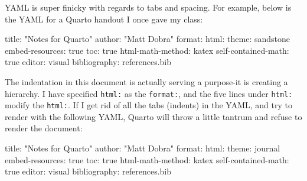 \documentclass[
  letterpaper,
]{book}
\newenvironment{Shaded}{\begin{snugshade}}{\end{snugshade}}
\newcommand{\NormalTok}[1]{\textcolor[rgb]{0.00,0.23,0.31}{#1}}
\newcommand{\SpecialCharTok}[1]{\textcolor[rgb]{0.37,0.37,0.37}{#1}}
\newcommand{\StringTok}[1]{\textcolor[rgb]{0.13,0.47,0.30}{#1}}
\begin{document}
\begin{tcolorbox}[enhanced jigsaw, colframe=quarto-callout-tip-color-frame, breakable, arc=.35mm, bottomtitle=1mm, bottomrule=.15mm, colbacktitle=quarto-callout-tip-color!10!white, rightrule=.15mm, colback=white, opacityback=0, opacitybacktitle=0.6, coltitle=black, left=2mm, toptitle=1mm, toprule=.15mm, titlerule=0mm, leftrule=.75mm, title=\textcolor{quarto-callout-tip-color}{\faLightbulb}\hspace{0.5em}{Tip from the Helpdesk: You Need to Give the YAML Space!}]

YAML is super finicky with regards to tabs and spacing. For example,
below is the YAML for a Quarto handout I once gave my class:

\begin{Shaded}
\begin{Highlighting}[]
\NormalTok{title}\SpecialCharTok{:} \StringTok{"Notes for Quarto"}
\NormalTok{author}\SpecialCharTok{:} \StringTok{"Matt Dobra"}
\NormalTok{format}\SpecialCharTok{:} 
\NormalTok{  html}\SpecialCharTok{:}
\NormalTok{    theme}\SpecialCharTok{:}\NormalTok{ sandstone  }
\NormalTok{    embed}\SpecialCharTok{{-}}\NormalTok{resources}\SpecialCharTok{:}\NormalTok{ true}
\NormalTok{    toc}\SpecialCharTok{:}\NormalTok{ true}
\NormalTok{    html}\SpecialCharTok{{-}}\NormalTok{math}\SpecialCharTok{{-}}\NormalTok{method}\SpecialCharTok{:}\NormalTok{ katex}
\NormalTok{    self}\SpecialCharTok{{-}}\NormalTok{contained}\SpecialCharTok{{-}}\NormalTok{math}\SpecialCharTok{:}\NormalTok{ true}
\NormalTok{editor}\SpecialCharTok{:}\NormalTok{ visual}
\NormalTok{bibliography}\SpecialCharTok{:}\NormalTok{ references.bib}
\end{Highlighting}
\end{Shaded}

The indentation in this document is actually serving a purpose-it is
creating a hierarchy. I have specified \texttt{html:} as the
\texttt{format:}, and the five lines under \texttt{html:} modify the
\texttt{html:}. If I get rid of all the tabs (indents) in the YAML, and
try to render with the following YAML, Quarto will throw a little
tantrum and refuse to render the document:

\begin{Shaded}
\begin{Highlighting}[]
\NormalTok{title}\SpecialCharTok{:} \StringTok{"Notes for Quarto"}
\NormalTok{author}\SpecialCharTok{:} \StringTok{"Matt Dobra"}
\NormalTok{format}\SpecialCharTok{:} 
\NormalTok{html}\SpecialCharTok{:}
\NormalTok{theme}\SpecialCharTok{:}\NormalTok{ journal  }
\NormalTok{embed}\SpecialCharTok{{-}}\NormalTok{resources}\SpecialCharTok{:}\NormalTok{ true}
\NormalTok{toc}\SpecialCharTok{:}\NormalTok{ true}
\NormalTok{html}\SpecialCharTok{{-}}\NormalTok{math}\SpecialCharTok{{-}}\NormalTok{method}\SpecialCharTok{:}\NormalTok{ katex}
\NormalTok{self}\SpecialCharTok{{-}}\NormalTok{contained}\SpecialCharTok{{-}}\NormalTok{math}\SpecialCharTok{:}\NormalTok{ true}
\NormalTok{editor}\SpecialCharTok{:}\NormalTok{ visual}
\NormalTok{bibliography}\SpecialCharTok{:}\NormalTok{ references.bib}
\end{Highlighting}
\end{Shaded}


\end{tcolorbox}
\end{document}

